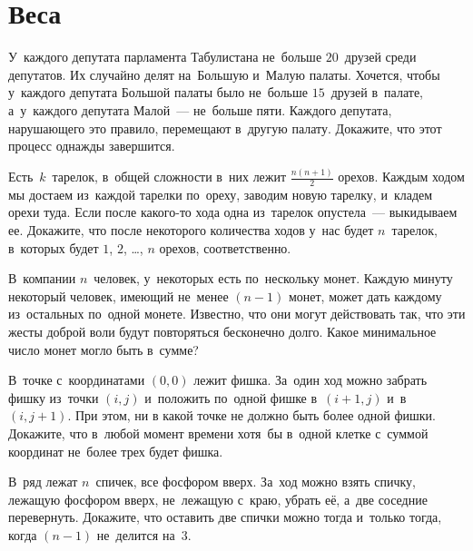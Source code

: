 
\section*{Веса}


\begin{problems}

\item
У~каждого депутата парламента Табулистана не~больше $20$~друзей среди
депутатов.
Их случайно делят на~Большую и~Малую палаты.
Хочется, чтобы у~каждого депутата Большой палаты было не~больше $15$~друзей
в~палате, а~у~каждого депутата Малой~--- не~больше пяти.
Каждого депутата, нарушающего это правило, перемещают в~другую палату.
Докажите, что этот процесс однажды завершится.

\item
Есть~$k$~тарелок, в~общей сложности в~них лежит $\frac{n (n + 1)}{2}$ орехов.
Каждым ходом мы достаем из~каждой тарелки по~ореху, заводим новую тарелку,
и~кладем орехи туда.
Если после какого-то хода одна из~тарелок опустела~--- выкидываем ее.
Докажите, что после некоторого количества ходов у~нас будет $n$~тарелок,
в~которых будет $1$, $2$, \ldots, $n$ орехов, соответственно.

\item
В~компании $n$~человек, у~некоторых есть по~нескольку монет.
Каждую минуту некоторый человек, имеющий не~менее $(n - 1)$ монет, может дать
каждому из~остальных по~одной монете.
Известно, что они могут действовать так, что эти жесты доброй воли будут
повторяться бесконечно долго.
Какое минимальное число монет могло быть в~сумме?

\item
В~точке с~координатами $(0, 0)$ лежит фишка.
За~один ход можно забрать фишку из~точки $(i, j)$ и~положить по~одной фишке
в~$(i + 1, j)$ и~в~$(i, j + 1)$.
При этом, ни в какой точке не должно быть более одной фишки.
Докажите, что в~любой момент времени хотя~бы в~одной клетке с~суммой координат
не~более трех будет фишка.

\item
В~ряд лежат $n$~спичек, все фосфором вверх.
За~ход можно взять спичку, лежащую фосфором вверх, не~лежащую с~краю, убрать
её, а~две соседние перевернуть.
Докажите, что оставить две спички можно тогда и~только тогда, когда $(n - 1)$
не~делится на~$3$.

\end{problems}

